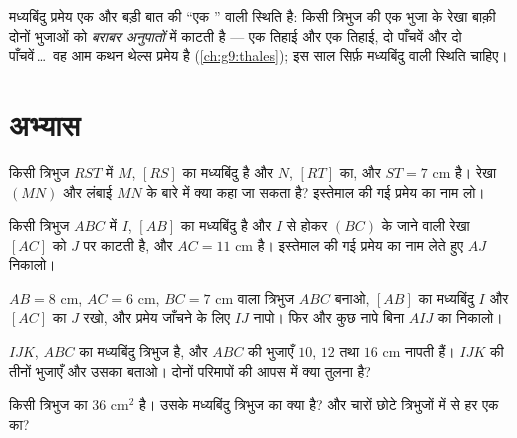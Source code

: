 \begin{remark}[थेल्स की ओर]
मध्यबिंदु प्रमेय एक और बड़ी बात की ``एक '' वाली स्थिति है: किसी
त्रिभुज की एक भुजा के  रेखा बाक़ी दोनों भुजाओं को \emph{बराबर
अनुपातों} में काटती है --- एक तिहाई और एक तिहाई, दो पाँचवें और दो
पाँचवें\,\dots\ वह आम कथन थेल्स प्रमेय है
(\cref{ch:g9:thales}); इस साल सिर्फ़ मध्यबिंदु वाली स्थिति चाहिए।
\end{remark}

\section{अभ्यास}

\begin{exercise}[$\star$]\label{exo:g8:midpoints:1}
किसी त्रिभुज $RST$ में $M$, $[RS]$ का मध्यबिंदु है और $N$, $[RT]$
का, और $ST = 7$ cm है। रेखा $(MN)$ और लंबाई $MN$ के बारे में क्या
कहा जा सकता है? इस्तेमाल की गई प्रमेय का नाम लो।
\end{exercise}

\begin{exercise}[$\star$]\label{exo:g8:midpoints:2}
किसी त्रिभुज $ABC$ में $I$, $[AB]$ का मध्यबिंदु है और $I$ से होकर
$(BC)$ के  जाने वाली रेखा $[AC]$ को $J$ पर काटती है, और
$AC = 11$ cm है। इस्तेमाल की गई प्रमेय का नाम लेते हुए $AJ$ निकालो।
\end{exercise}

\begin{exercise}[$\star$]\label{exo:g8:midpoints:3}
$AB = 8$ cm, $AC = 6$ cm, $BC = 7$ cm वाला त्रिभुज $ABC$ बनाओ,
$[AB]$ का मध्यबिंदु $I$ और $[AC]$ का $J$ रखो, और प्रमेय जाँचने के
लिए $IJ$ नापो। फिर और कुछ नापे बिना $AIJ$ का  निकालो।
\end{exercise}

\begin{exercise}[$\star$]\label{exo:g8:midpoints:4}
$IJK$, $ABC$ का मध्यबिंदु त्रिभुज है, और $ABC$ की भुजाएँ $10$, $12$
तथा $16$ cm नापती हैं। $IJK$ की तीनों भुजाएँ और उसका  बताओ।
दोनों परिमापों की आपस में क्या तुलना है?
\end{exercise}

\begin{exercise}[$\star$]\label{exo:g8:midpoints:5}
किसी त्रिभुज का  $36$ cm$^2$ है। उसके मध्यबिंदु त्रिभुज का
 क्या है? और चारों छोटे त्रिभुजों में से हर एक का?
\end{exercise}

